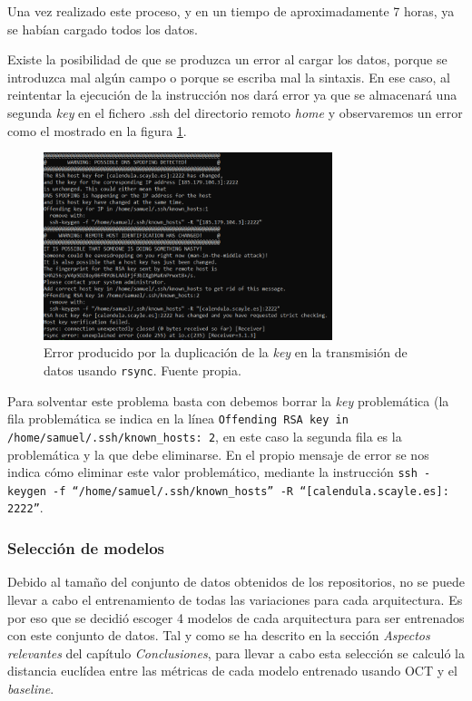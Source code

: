 Una vez realizado este proceso, y en un tiempo de aproximadamente 7 horas, ya se habían cargado todos los datos.

Existe la posibilidad de que se produzca un error al cargar los datos, porque se introduzca mal algún campo o porque se escriba mal la sintaxis. En ese caso, al reintentar la ejecución de la instrucción nos dará error ya que se almacenará una segunda \textit{key} en el fichero .ssh del directorio remoto \textit{home} y observaremos un error como el mostrado en la figura \ref{fig:error_scayle}.

\begin{figure}[h]
    \centering
    \includegraphics[width=0.75\textwidth]{img/error_scayle.png}
    \caption{Error producido por la duplicación de la \textit{key} en la transmisión de datos usando \texttt{rsync}. Fuente propia.}
    \label{fig:error_scayle}
\end{figure}

Para solventar este problema basta con debemos borrar la \textit{key} problemática (la fila problemática se indica en la línea \texttt{Offending RSA  key in /home/samuel/.ssh/known\_hosts: 2}, en este caso la segunda fila es la problemática y la que debe eliminarse. En el propio mensaje de error se nos indica cómo eliminar este valor problemático, mediante la instrucción \texttt{ssh -keygen -f ``/home/samuel/.ssh/known\_hosts'' -R ``[calendula.scayle.es]:\\2222''}.

\subsubsection{Selección de modelos}

Debido al tamaño del conjunto de datos obtenidos de los repositorios, no se puede llevar a cabo el entrenamiento de todas las variaciones para cada arquitectura. Es por eso que se decidió escoger 4 modelos de cada arquitectura para ser entrenados con este conjunto de datos. Tal y como se ha descrito en la sección \textit{Aspectos relevantes} del capítulo \textit{Conclusiones}, para llevar a cabo esta selección se calculó la distancia euclídea entre las métricas de cada modelo entrenado usando OCT y el \textit{baseline}.

